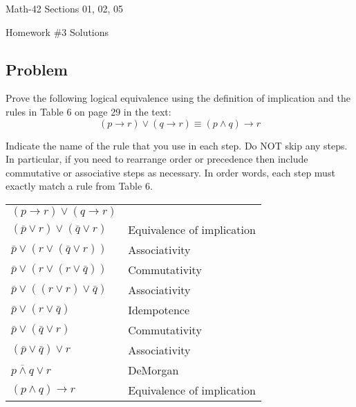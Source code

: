 \documentclass[letterpaper,12pt,fleqn]{article}
\renewcommand{\implies}{\rightarrow}
\begin{document}
\begin{center}
  \large
  Math-42 Sections 01, 02, 05

  \Large
  Homework \#3 Solutions
\end{center}

\subsection*{Problem}

Prove the following logical equivalence using the definition of implication and the rules in Table 6 on page 29 in
the text:
\[(p\implies r)\lor(q\implies r)\equiv(p\land q)\implies r\]

Indicate the name of the rule that you use in each step.  Do NOT skip any steps.  In particular, if you need to
rearrange order or precedence then include commutative or associative steps as necessary.  In order words, each
step must exactly match a rule from Table 6.

\begin{tabular}{ll}
  \((p\implies r)\lor(q\implies r)\) & \\
  \((\bar{p}\lor r)\lor(\bar{q}\lor r)\) & Equivalence of implication \\
  \(\bar{p}\lor(r\lor(\bar{q}\lor r))\) & Associativity \\
  \(\bar{p}\lor(r\lor(r\lor\bar{q}))\) & Commutativity \\
  \(\bar{p}\lor((r\lor r)\lor\bar{q})\) & Associativity \\
  \(\bar{p}\lor(r\lor\bar{q})\) & Idempotence \\
  \(\bar{p}\lor(\bar{q}\lor r)\) & Commutativity \\
  \((\bar{p}\lor\bar{q})\lor r\) & Associativity \\
  \(\overline{p\land q}\lor r\) & DeMorgan \\
  \((p\land q)\implies r\) & Equivalence of implication
\end{tabular}
\end{document}
